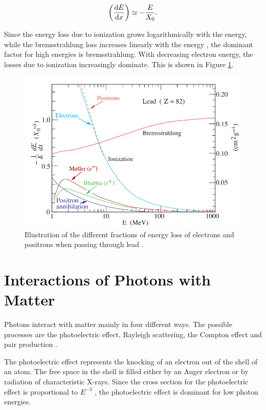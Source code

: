 \documentclass[12pt, a4paper]{thesis}
\begin{document}
\begin{align}
  \left( \dv{E}{x} \right) \simeq - \frac{E}{X_0}.
\end{align}

Since the energy loss due to ionization grows logarithmically with
the energy, while the bremsstrahlung loss increases linearly with the
energy \cite{PhysRevD.98.030001}, the dominant factor for high
energies is bremsstrahlung. With decreasing electron energy, the
losses due to ionization increasingly dominate. This is shown in
Figure \ref{bremsstrahlung}.

\begin{figure}[hbtp]
  \centering
  \includegraphics[width=0.8 \textwidth]{../images/bremsstrahlung.png}
  \caption{ Illustration of the different fractions of energy loss of
    electrons and positrons when passing through lead
    \cite{PhysRevD.98.030001}.}
  \label{bremsstrahlung}
\end{figure}


\clearpage
\section{Interactions of Photons with Matter}

Photons interact with matter mainly in four different ways. The
possible processes are the photoelectric effect, Rayleigh scattering,
the Compton effect and pair production \cite{wigman18}.

The photoelectric effect represents the knocking of an electron out of
the shell of an atom. The free space in the shell is filled either by
an Auger electron or by radiation of characteristic X-rays. Since the
cross section for the photoelectric effect is proportional to $E^{-3}$
\cite{wigman18}, the photoelectric effect is dominant for low photon
energies.
\end{document}
